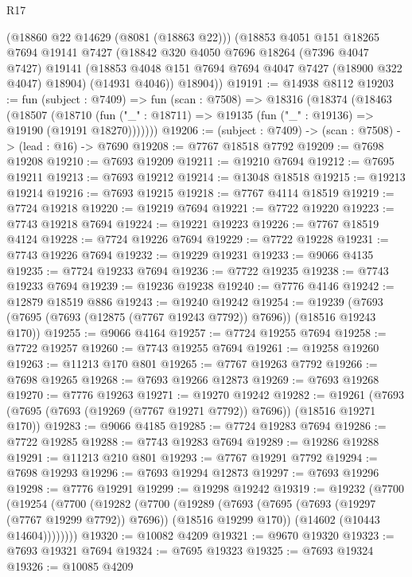 \begin{lexlean}{R17}
\begin{coremodule}
      (@18860 @22 @14629 (@8081 (@18863 @22)))
      (@18853
        @4051
        @151
        @18265
        @7694
        @19141
        @7427
        (@18842
          @320
          @4050
          @7696
          @18264
          (@7396 @4047 @7427)
          @19141
          (@18853 @4048 @151 @7694 @7694 @4047 @7427 (@18900 @322 @4047) @18904)
          (@14931 @4046))
        @18904))
@19191 := @14938 @8112
@19203 := fun (subject : @7409) =>
  fun (scan : @7508) =>
  @18316
    (@18374
      (@18463
        (@18507
          (@18710 (fun ("_" : @18711) => @19135 (fun ("_" : @19136) => @19190 (@19191 @18270)))))))
@19206 := (subject : @7409) -> (scan : @7508) -> (lead : @16) -> @7690
@19208 := @7767 @18518 @7792
@19209 := @7698 @19208
@19210 := @7693 @19209
@19211 := @19210 @7694
@19212 := @7695 @19211
@19213 := @7693 @19212
@19214 := @13048 @18518
@19215 := @19213 @19214
@19216 := @7693 @19215
@19218 := @7767 @4114 @18519
@19219 := @7724 @19218
@19220 := @19219 @7694
@19221 := @7722 @19220
@19223 := @7743 @19218 @7694
@19224 := @19221 @19223
@19226 := @7767 @18519 @4124
@19228 := @7724 @19226 @7694
@19229 := @7722 @19228
@19231 := @7743 @19226 @7694
@19232 := @19229 @19231
@19233 := @9066 @4135
@19235 := @7724 @19233 @7694
@19236 := @7722 @19235
@19238 := @7743 @19233 @7694
@19239 := @19236 @19238
@19240 := @7776 @4146
@19242 := @12879 @18519 @886
@19243 := @19240 @19242
@19254 := @19239 (@7693 (@7695 (@7693 (@12875 (@7767 @19243 @7792)) @7696)) (@18516 @19243 @170))
@19255 := @9066 @4164
@19257 := @7724 @19255 @7694
@19258 := @7722 @19257
@19260 := @7743 @19255 @7694
@19261 := @19258 @19260
@19263 := @11213 @170 @801
@19265 := @7767 @19263 @7792
@19266 := @7698 @19265
@19268 := @7693 @19266 @12873
@19269 := @7693 @19268
@19270 := @7776 @19263
@19271 := @19270 @19242
@19282 := @19261 (@7693 (@7695 (@7693 (@19269 (@7767 @19271 @7792)) @7696)) (@18516 @19271 @170))
@19283 := @9066 @4185
@19285 := @7724 @19283 @7694
@19286 := @7722 @19285
@19288 := @7743 @19283 @7694
@19289 := @19286 @19288
@19291 := @11213 @210 @801
@19293 := @7767 @19291 @7792
@19294 := @7698 @19293
@19296 := @7693 @19294 @12873
@19297 := @7693 @19296
@19298 := @7776 @19291
@19299 := @19298 @19242
@19319 := @19232
    (@7700
      (@19254
        (@7700
          (@19282
            (@7700
              (@19289
                (@7693 (@7695 (@7693 (@19297 (@7767 @19299 @7792)) @7696)) (@18516 @19299 @170))
                (@14602 (@10443 @14604))))))))
@19320 := @10082 @4209
@19321 := @9670 @19320
@19323 := @7693 @19321 @7694
@19324 := @7695 @19323
@19325 := @7693 @19324
@19326 := @10085 @4209

\end{coremodule}
\end{lexlean}
